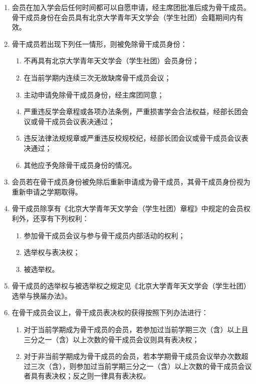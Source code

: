 \begin{enumerate}[resume]
    \item 会员在加入学会后任何时间都可以自愿申请，经主席团批准后成为骨干成员。骨干成员身份在会员具有北京大学青年天文学会（学生社团）会籍期间内有效。
    
    \item 骨干成员若出现下列任一情形，则被免除骨干成员身份：
    \begin{enumerate}
        \item 不再具有北京大学青年天文学会（学生社团）会员身份；
        \item 在当前学期内连续三次无故缺席骨干成员会议；
        \item 主动申请免除骨干成员身份，经主席团同意；
        \item 严重违反学会章程或各项办法条例，严重损害学会合法权益，经部长团会议或骨干成员会议表决通过；
        \item 违反法律法规规章或严重违反校规校纪，经部长团会议或骨干成员会议表决通过；
        \item 其他应予免除骨干成员身份的情况。
    \end{enumerate}

    \item 会员若在骨干成员身份被免除后重新申请成为骨干成员，其骨干成员身份视为重新申请之学期取得。
    
    \item 骨干成员除享有《北京大学青年天文学会（学生社团）章程》中规定的会员权利外，还享有下列权利：
    \begin{enumerate}
        \item 参加骨干成员会议与参与骨干成员内部活动的权利；
        \item 选举权与表决权；
        \item 被选举权。
    \end{enumerate}

    \item 骨干成员的选举权与被选举权之规定见《北京大学青年天文学会（学生社团）选举与换届办法》。
    
    \item 在骨干成员会议上，骨干成员表决权的获得按照下列办法进行：\label{item:right_for_vote}
    \begin{enumerate}
        \item 对于当前学期成为骨干成员的会员，若参加过当前学期三次（含）以上且三分之一（含）以上次数的骨干成员会议则具有表决权；
        \item 对于非当前学期成为骨干成员的会员，若本学期骨干成员会议举办次数超过三次（含），则参加过当前学期三分之一（含）以上次数的骨干成员会议者具有表决权；反之则一律具有表决权。
    \end{enumerate}


\end{enumerate}
